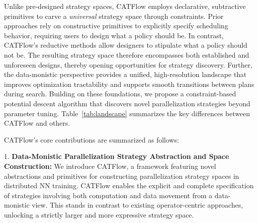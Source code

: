 \documentclass[letterpaper,twocolumn,10pt]{article}
\newcommand{\name}{CATFlow}
\begin{document}

Unlike pre-designed strategy spaces, \name{} employs declarative, subtractive primitives to carve a \textit{universal} strategy space through constraints. Prior approaches rely on constructive primitives to explicitly specify scheduling behavior, requiring users to design what a policy should be. In contrast, \name{}'s reductive methods allow designers to stipulate what a policy should not be. The resulting strategy space therefore encompasses both established and unforeseen designs, thereby opening opportunities for strategy discovery. Further, the data-monistic perspective provides a unified, high-resolution landscape that improves optimization tractability and supports smooth transitions between plans during search. Building on these foundations, we propose a constraint-based potential descent algorithm that discovers novel parallelization strategies beyond parameter tuning. Table~\ref{tab:landscape} summarizes the key differences between \name{} and others.

\name{}'s core contributions are summarized as follows:

1. \textbf{Data-Monistic Parallelization Strategy Abstraction and Space Construction:} We introduce \name{}, a framework featuring novel abstractions and primitives for constructing parallelization strategy spaces in distributed NN training. \name{} enables the explicit and complete specification of strategies involving both computation and data movement from a data-monistic view. This stands in contrast to existing operator-centric approaches, unlocking a strictly larger and more expressive strategy space.
\end{document}
